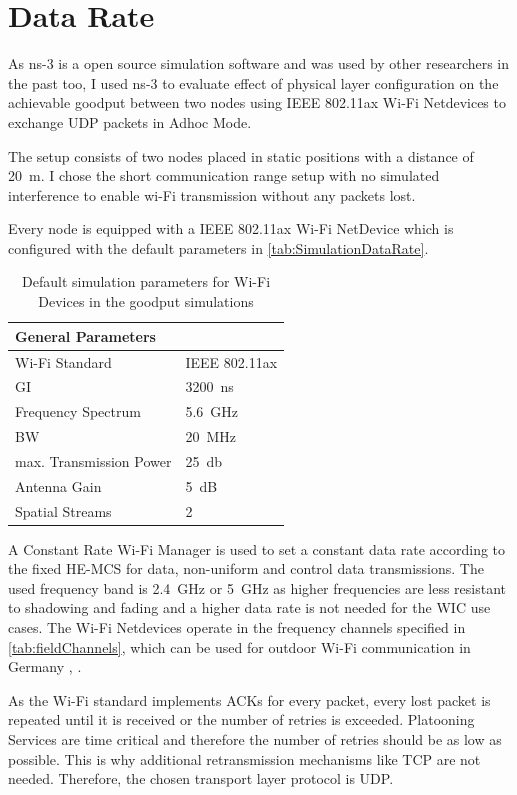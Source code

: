 \section{Data Rate}
\label{sec:DataRate}
As ns-3 is a open source simulation software and was used by other researchers in the past too, I used ns-3
to evaluate effect of physical layer configuration on the achievable goodput between two nodes using IEEE 802.11ax Wi-Fi Netdevices
to exchange UDP packets in Adhoc Mode.

The setup consists of two nodes placed in static positions with a distance of \SI{20}{\metre}.
I chose the short communication range setup with no simulated interference to enable wi-Fi transmission without any packets lost.

Every node is equipped with a IEEE 802.11ax Wi-Fi NetDevice which is configured with the default parameters in
\autoref{tab:SimulationDataRate}.
\begin{table}[H]
	\centering
	\begin{tabular}{p{6cm}p{4cm}}
		General Parameters & \\
		\midrule
		Wi-Fi Standard & IEEE 802.11ax\\
		\ac{GI} & \SI{3200}{\nano\second}\\
		Frequency Spectrum & \SI{5.6}{\giga\hertz}\\
		\ac{BW} & \SI{20}{\mega\hertz}\\
		max. Transmission Power & \SI{25}{\decibel}\\
		Antenna Gain & \SI{5}{\dB}\\
		Spatial Streams & 2\\
		\bottomrule
	\end{tabular}
	\caption{Default simulation parameters for Wi-Fi Devices in the goodput simulations}
	\label{tab:SimulationDataRate}
\end{table}

A Constant Rate Wi-Fi Manager is used to set a constant data rate according to the fixed HE-\ac{MCS} for data, non-uniform and control data transmissions.
The used frequency band is \SI{2.4}{\giga\hertz} or \SI{5}{\giga\hertz} as higher frequencies are less resistant to shadowing and fading and a higher data rate is not needed for the \ac{WIC} use cases.
The Wi-Fi Netdevices operate in the frequency channels specified in \autoref{tab:fieldChannels}, which can be used for
outdoor Wi-Fi communication in Germany \cite{freq_plan_24G}, \cite{freq_plan_5G}.

As the Wi-Fi standard implements ACKs for every packet, every lost packet is repeated until it is received or the number of retries is
exceeded.
Platooning Services are time critical and therefore the number of retries should be as low as possible.
This is why additional retransmission mechanisms like TCP are not needed.
Therefore, the chosen transport layer protocol is UDP.

